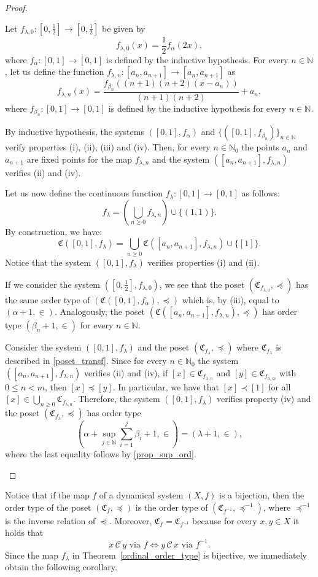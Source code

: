 \documentclass[pdflatex,sn-mathphys-num]{sn-jnl}
\theoremstyle{thmstyleone}%
\theoremstyle{thmstyletwo}%
\theoremstyle{thmstylethree}%
\begin{document}
\begin{proof}
\begin{itemize}
Let $f_{\lambda,0}:[0,\frac{1}{2}]\to[0,\frac{1}{2}]$ be given by 
$$
f_{\lambda,0}(x)=\frac{1}{2}f_\alpha(2x),
$$
where $f_\alpha:[0,1]\to [0,1]$ is defined by the inductive hypothesis.
For every $n\in\mathbb{N}$, let us define the function $f_{\lambda,n}:[a_n,a_{n+1}]\to [a_{n},a_{n+1}]$ as 
\[
f_{\lambda,n}(x)=\frac{f_{\beta_n}((n+1)(n+2)(x-a_n))}{(n+1)(n+2)}+a_n,
\]
where $f_{\beta_n}:[0,1]\to [0,1]$ is defined by the inductive hypothesis for every $n\in \mathbb{N}$.

By inductive hypothesis, the systems $([0,1],f_\alpha)$ and $\{([0,1],f_{\beta_n})\}_{n\in\mathbb{N}}$ verify properties (i), (ii), (iii) and (iv).
Then, for every $n\in\mathbb{N}_0$ the points $a_n$ and $a_{n+1}$ are fixed points for the map $f_{\lambda,n}$ and the system $([a_n,a_{n+1}],f_{\lambda,n})$ verifies (ii) and (iv).

Let us now define the continuous function $f_\lambda:[0,1]\rightarrow[0,1]$ as follows:
\[
f_\lambda=\left(\bigcup_{n\geq 0}f_{\lambda,n}\right)\cup\{(1,1)\}.
\]
By construction, we have:
\begin{equation}\label{poset_transf}
  \mathfrak{C}([0,1],{f_\lambda})=\bigcup_{n\ge 0} \mathfrak{C}([a_n,a_{n+1}],f_{\lambda,n})\cup \{[1]\}.  
\end{equation}
Notice that the system $([0,1],f_\lambda)$ verifies properties (i) and (ii).

If we consider the system $([0,\frac 1 2],{f_{\lambda,0}})$, we see that the poset $(\mathfrak{C}_{f_{\lambda,0}},\preceq)$ has the same order type of $(\mathfrak{C}([0,1],{f_\alpha}),\preceq)$ which is, by (iii), equal to $(\alpha+1,\in)$.
Analogously, the poset $(\mathfrak{C}([a_n,a_{n+1}],{f_{\lambda,n}}),\preceq)$ has order type $(\beta_n+1,\in)$ for every $n\in\mathbb{N}$.  

Consider the system $([0,1],f_\lambda)$ and the poset $(\mathfrak{C}_{f_\lambda},\preceq)$ where $\mathfrak{C}_{f_\lambda}$ is described in \eqref{poset_transf}. 
Since for every $n\in\mathbb{N}_0$ the system $([a_n,a_{n+1}],f_{\lambda,n})$ verifies (ii) and (iv), if $[x]\in \mathfrak{C}_{f_{\lambda,n}}$ and $[y]\in \mathfrak{C}_{f_{\lambda,m}}$ with $0\le n<m$, then $[x]\preceq [y]$. 
In particular, we have that $[x]\prec [1]$ for all $[x]\in \bigcup_{n\ge 0} \mathfrak{C}_{f_{\lambda,n}}$.
Therefore, the system $([0,1],f_\lambda)$ verifies property (iv) and the poset $(\mathfrak{C}_{f_\lambda},\preceq)$ has order type 
$$
\left(\alpha+\sup_{j\in\mathbb{N}}\sum_{i=1}^j \beta_i+1,\in \right)=(\lambda+1,\in),
$$
where the last equality follows by \eqref{prop_sup_ord}.
\end{itemize}
\end{proof}
\noindent Notice that if the map $f$ of a dynamical system $(X,f)$ is a bijection, then the order type of the poset $(\mathfrak{C}_f,\preceq)$ is the order type of $(\mathfrak{C}_{f^{-1}},\preceq^{-1})$, where $\preceq^{-1}$ is the inverse relation of $\preceq$.
Moreover, $\mathfrak{C}_f = \mathfrak{C}_{f^{-1}}$ because for every $x, y \in X$ it holds that
\[
x\,\mathcal{C}\, y \text{ via $f$} \iff y\,\mathcal{C}\, x \text{ via $f^{-1}$}.
\]
\noindent Since the map $f_\lambda$ in Theorem~\ref{ordinal_order_type} is bijective, we immediately obtain the following corollary.
\end{document}
